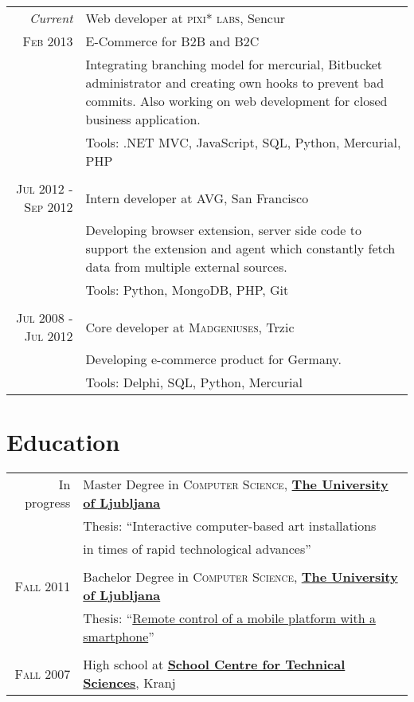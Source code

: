 \documentclass[a4paper,10pt]{article} %
\begin{document}
\begin{tabular}{r|p{10cm}}
\emph{Current} & Web developer at \textsc{pixi* labs}, Sencur \\
\textsc{Feb 2013} & E-Commerce for B2B and B2C\\
& \footnotesize{Integrating branching model for mercurial, Bitbucket administrator and creating own hooks to prevent bad commits. Also working on web development for closed business application.} \\
& \footnotesize{Tools: .NET MVC, JavaScript, SQL, Python, Mercurial, PHP} \\
\multicolumn{2}{c}{} \\

\textsc{Jul 2012 - Sep 2012} & Intern developer at \textsc{AVG}, San Francisco \emph{}\\
& \footnotesize{Developing browser extension, server side code to support the extension and agent which constantly fetch data from multiple external sources.} \\
& \footnotesize{Tools: Python, MongoDB, PHP, Git} \\ 
\multicolumn{2}{c}{} \\

\textsc{Jul 2008 - Jul 2012} & Core developer at \textsc{Madgeniuses}, Trzic \emph{}\\
& \footnotesize{Developing e-commerce product for Germany.}\\
& \footnotesize{Tools: Delphi, SQL, Python, Mercurial}\\
\end{tabular}


\section{Education}

\begin{tabular}{rl}	
In progress & Master Degree in \textsc{Computer Science}, \href{www.fri.uni-lj.si}{\textbf{The University of Ljubljana}} \\
& Thesis: ``Interactive computer-based art installations\\ & \hphantom{Thesis: ``}in times of rapid technological advances'' \\
\\

\textsc{Fall} 2011 & Bachelor Degree in \textsc{Computer Science}, \href{www.fri.uni-lj.si}{\textbf{The University of Ljubljana}} \\
& Thesis: ``\href{https://github.com/majcn/roomba}{Remote control of a mobile platform with a smartphone}'' \\
\\

\textsc{Fall} 2007 & High school at \href{http://www.sckr.si/}{\textbf{School Centre for Technical Sciences}}, Kranj\\
\end{tabular}
\end{document}
